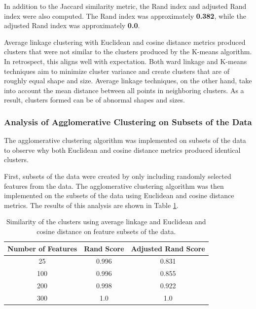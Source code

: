 \documentclass[12pt]{article}
\begin{document}
In addition to the Jaccard similarity metric, the Rand index and adjusted Rand index were also computed. The Rand index was approximately \textbf{0.382}, while the adjusted Rand index was approximately \textbf{0.0}.

Average linkage clustering with Euclidean and cosine distance metrics produced clusters that were not similar to the clusters produced by the K-means algorithm. In retrospect, this aligns well with expectation. Both ward linkage and K-means techniques aim to minimize cluster variance and create clusters that are of roughly equal shape and size. Average linkage techniques, on the other hand, take into account the mean distance between all points in neighboring clusters. As a result, clusters formed can be of abnormal shapes and sizes. 

\subsubsection{Analysis of Agglomerative Clustering on Subsets of the Data}
The agglomerative clustering algorithm was implemented on subsets of the data to observe why both Euclidean and cosine distance metrics produced identical clusters. 

First, subsets of the data were created by only including randomly selected features from the data. The agglomerative clustering algorithm was then implemented on the subsets of the data using Euclidean and cosine distance metrics. The results of this analysis are shown in Table \ref{tab:agglo_euc_sub}.

\begin{table}[H]
    \centering
    \begin{tabular}{|c|c|c|}
        \hline 
        \textbf{Number of Features} & \textbf{Rand Score} & \textbf{Adjusted Rand Score} \\
        \hline
        25 & 0.996 & 0.831 \\
        100 & 0.996 & 0.855 \\
        200 & 0.998 & 0.922 \\
        300 & 1.0 & 1.0 \\
        \hline
    \end{tabular}
    \caption{Similarity of the clusters using average linkage and Euclidean and cosine distance on feature subsets of the data.}
    \label{tab:agglo_euc_sub}
\end{table}

\vspace{-0.5cm}
\end{document}
